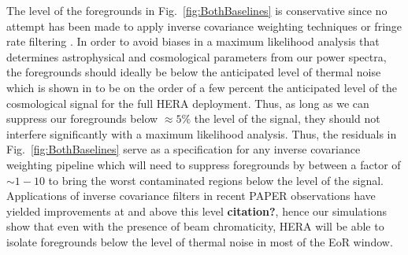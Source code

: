 \documentclass[twocolumn]{emulateapj}
\begin{document}
The level of the foregrounds in Fig.~\ref{fig:BothBaselines} is conservative since no attempt has been made to apply inverse covariance weighting techniques \citep{Tegmark:1997a,Liu:2011,Dillon:2013,Parsons:2014,Liu:2014a,Liu:2014b,Dillon:2015a,Dillon:2015b,Trott:2016} or fringe rate filtering \citep{Parsons:2015}. In order to avoid biases in a maximum likelihood analysis that determines astrophysical and cosmological parameters from our power spectra, the foregrounds should ideally be below the anticipated level of thermal noise which is shown in \citet{Pober:2014} to be on the order of a few percent the anticipated level of the cosmological signal for the full HERA deployment. Thus, as long as we can suppress our foregrounds below $\approx 5$\% the level of the signal, they should not interfere significantly with a maximum likelihood analysis. Thus, the residuals in Fig.~\ref{fig:BothBaselines} serve as a specification for any inverse covariance weighting pipeline which will need to suppress foregrounds by between a factor of $\sim 1-10$ to bring the worst contaminated regions below the level of the signal. Applications of inverse covariance filters in recent PAPER observations have yielded improvements at and above this level {\bf \color{red} citation?}, hence our simulations show that even with the presence of beam chromaticity, HERA will be able to isolate foregrounds below the level of thermal noise in most of the EoR window. 
\end{document}
